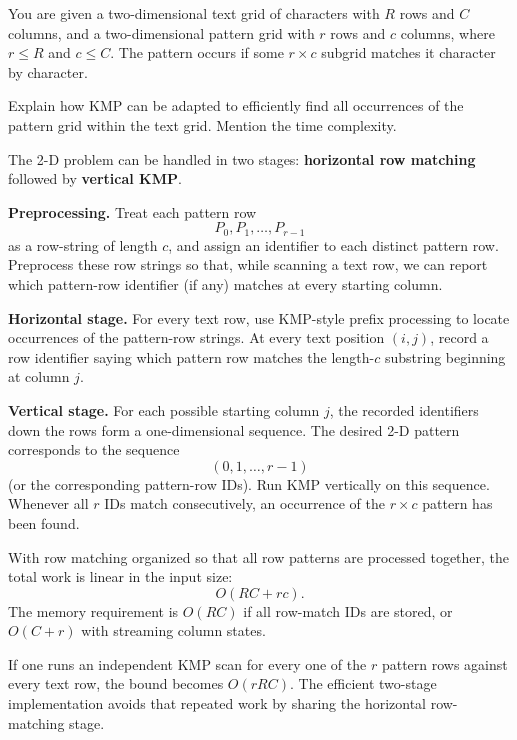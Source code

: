 \documentclass[11pt,a4paper]{article}
\begin{document}
\begin{qaquestion}
You are given a two-dimensional text grid of characters with \(R\) rows and \(C\) columns, and a two-dimensional pattern grid with \(r\) rows and \(c\) columns, where \(r\le R\) and \(c\le C\). The pattern occurs if some \(r\times c\) subgrid matches it character by character.

Explain how KMP can be adapted to efficiently find all occurrences of the pattern grid within the text grid. Mention the time complexity.
\end{qaquestion}

\begin{qaanswer}[Answer 3(b)]
The 2-D problem can be handled in two stages: \textbf{horizontal row matching} followed by \textbf{vertical KMP}.

\textbf{Preprocessing.}
Treat each pattern row
\[
P_0,P_1,\ldots,P_{r-1}
\]
as a row-string of length \(c\), and assign an identifier to each distinct pattern row. Preprocess these row strings so that, while scanning a text row, we can report which pattern-row identifier (if any) matches at every starting column.

\textbf{Horizontal stage.}
For every text row, use KMP-style prefix processing to locate occurrences of the pattern-row strings. At every text position \((i,j)\), record a row identifier saying which pattern row matches the length-\(c\) substring beginning at column \(j\).

\textbf{Vertical stage.}
For each possible starting column \(j\), the recorded identifiers down the rows form a one-dimensional sequence. The desired 2-D pattern corresponds to the sequence
\[
(0,1,\ldots,r-1)
\]
(or the corresponding pattern-row IDs). Run KMP vertically on this sequence. Whenever all \(r\) IDs match consecutively, an occurrence of the \(r\times c\) pattern has been found.

With row matching organized so that all row patterns are processed together, the total work is linear in the input size:
\[
\boxed{O(RC+rc)}.
\]
The memory requirement is \(O(RC)\) if all row-match IDs are stored, or \(O(C+r)\) with streaming column states.

\begin{warningbox}
If one runs an independent KMP scan for every one of the \(r\) pattern rows against every text row, the bound becomes \(O(rRC)\). The efficient two-stage implementation avoids that repeated work by sharing the horizontal row-matching stage.
\end{warningbox}
\end{qaanswer}
\end{document}
